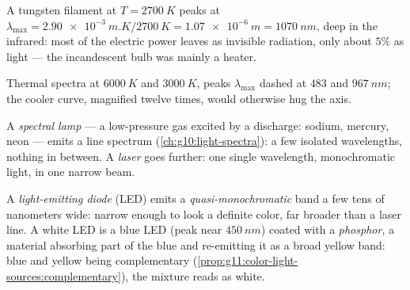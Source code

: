 \begin{example}\label{ex:g11:color-light-sources:bulb}
A tungsten filament at $T = \qty{2700}{K}$ peaks at
$\lambda_{\max} = \qty{2.90e-3}{m.K}/\qty{2700}{K} = \qty{1.07e-6}{m}
= \qty{1070}{nm}$, deep in the infrared: most of the electric power
leaves as invisible radiation, only about $5\%$ as light --- the
incandescent bulb was mainly a heater.
\end{example}

\begin{omfigure}

{\small Thermal spectra at $\qty{6000}{K}$ and $\qty{3000}{K}$, peaks
$\lambda_{\max}$ dashed at $483$ and $\qty{967}{nm}$; the cooler curve,
magnified twelve times, would otherwise hug the axis.}
\end{omfigure}

\begin{definition}\label{def:g11:color-light-sources:lamps}
A \emph{spectral lamp} --- a low-pressure gas
excited by a discharge: sodium, mercury, neon --- emits a line spectrum
(\cref{ch:g10:light-spectra}): a few isolated wavelengths, nothing in
between. A \emph{laser} goes further: one single
wavelength, monochromatic light, in one narrow beam.
\end{definition}

\begin{definition}[LEDs]\label{def:g11:color-light-sources:led}
A \emph{light-emitting diode} (LED) emits a
\emph{quasi-monochromatic} band a few tens of nanometers wide: narrow
enough to look a definite color, far broader than a laser line. A white
LED is a blue LED (peak near $\qty{450}{nm}$) coated with a
\emph{phosphor}, a material absorbing part of the blue
and re-emitting it as a broad yellow band: blue and yellow being
complementary (\cref{prop:g11:color-light-sources:complementary}), the
mixture reads as white.
\end{definition}

